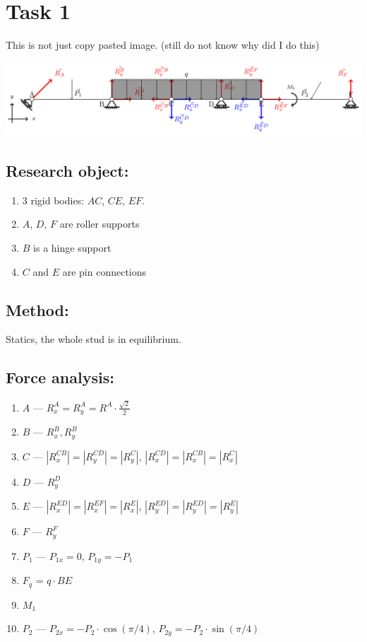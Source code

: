 \section{Task 1}

This is not just copy pasted image. (still do not know why did I do this)

\includegraphics[width=\linewidth]{graphics/task1.pdf}

\subsection*{Research object:}
\begin{enumerate}
    \item 3 rigid bodies: $AC$, $CE$, $EF$.
    \item $A$, $D$, $F$ are roller supports
    \item $B$ is a hinge support
    \item $C$ and $E$ are pin connections
\end{enumerate}

\subsection*{Method: }

Statics, the whole stud is in equilibrium.

\subsection*{Force analysis:}

\begin{enumerate}
    \item $A$ --- $R^{A}_x = R^{A}_y = R^{A} \cdot \frac{\sqrt{2}}{2}$
    \item $B$ --- $R^{B}_x, R^{B}_y$
    \item $C$ --- $|R^{CB}_x| = |R^{CD}_y| = |R^{C}_y|$, $|R^{CD}_x| = |R^{CB}_x| = |R^{C}_x|$
    \item $D$ --- $R^{D}_y$
    \item $E$ --- $|R^{ED}_x| = |R^{EF}_x| = |R^{E}_x|$, $|R^{ED}_y| = |R^{ED}_y| = |R^{E}_y|$
    \item $F$ --- $R^{F}_y$
    \item $P_1$ --- $P_{1x} = 0$, $P_{1y} = - P_1$
    \item $F_q$ = $q \cdot BE$
    \item $M_1$
    \item $P_2$ --- $P_{2x} = - P_2 \cdot \cos (\pi / 4)$, $P_{2y} = - P_2 \cdot \sin (\pi / 4)$
\end{enumerate}

